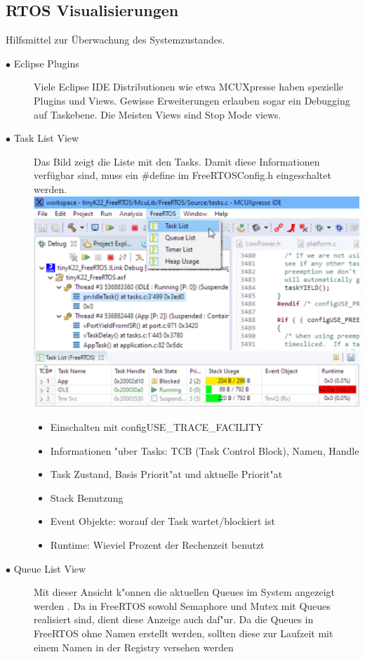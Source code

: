 \documentclass[a4paper, 8pt]{extarticle}
\begin{document}
\begin{multicols*}{3}
			\subsection{RTOS Visualisierungen}
				Hilfsmittel zur Überwachung des Systemzustandes.
					\begin{description}				
						\item[$\bullet$ Eclipse Plugins]
							Viele Eclipse IDE Distributionen wie etwa MCUXpresse haben spezielle Plugins und Views. Gewisse Erweiterungen erlauben
							sogar ein Debugging auf Taskebene. Die Meisten Views sind Stop Mode views. 
						\item[$\bullet$ Task List View]
							 Das Bild zeigt die Liste mit den Tasks. Damit diese Informationen verfügbar sind, muss ein \#define im FreeRTOSConfig.h 
							 eingeschaltet werden.
							 \includegraphics[width=0.6\linewidth,left]{img/Queue_List_view.PNG}
							 \begin{itemize}
								 \item Einschalten mit configUSE\_TRACE\_FACILITY
								 \item Informationen "uber Tasks: TCB (Task Control Block), Namen, Handle
								 \item Task Zustand, Basis Priorit"at und aktuelle Priorit"at
								 \item Stack Benutzung
								 \item Event Objekte: worauf der Task wartet/blockiert ist
								 \item Runtime: Wieviel Prozent der Rechenzeit benutzt
							 \end{itemize}
						\item[$\bullet$ Queue List View]	
							Mit dieser Ansicht k"onnen die aktuellen Queues im System angezeigt werden
							. Da in FreeRTOS sowohl Semaphore und Mutex mit Queues
							realisiert sind, dient diese Anzeige auch daf"ur. Da die Queues in FreeRTOS 
							ohne Namen erstellt werden, sollten diese zur Laufzeit mit einem Namen in der
							Registry versehen werden

\end{description}
\end{multicols*}
\end{document}
